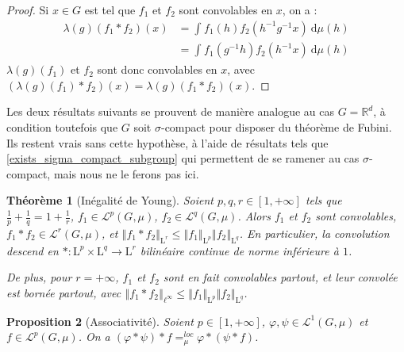 \documentclass[a4paper,12pt]{article}
\newtheorem{theorem}{Théorème}[section]
\newtheorem{proposition}[theorem]{Proposition}
\newcommand{\R}{\mathbb{R}}
\newcommand{\norm}[1]{\left\Vert #1\right\Vert}
\newcommand{\integral}[4]{\int_{#1}^{#2} #3~\mathrm{d}#4}
\newcommand{\inv}{^{-1}}
\begin{document}
\begin{proof}
    Si $x\in G$ est tel que $f_1$ et $f_2$ sont convolables en $x$, on a :
    \begin{align*}
        \lambda(g)(f_1\ast f_2)(x) 
            &= \integral{}{}{f_1(h)f_2(h\inv g\inv x)}{\mu(h)} \\
            &= \integral{}{}{f_1(g\inv h)f_2(h\inv x)}{\mu(h)} 
    \end{align*}
    $\lambda(g)(f_1)$ et $f_2$ sont donc convolables en $x$, avec $(\lambda(g)(f_1)\ast f_2)(x) = \lambda(g)(f_1\ast f_2)(x)$.
\end{proof}

Les deux résultats suivants se prouvent de manière analogue au cas $G = \R^d$, à condition toutefois que 
$G$ soit $\sigma$-compact pour disposer du théorème de Fubini. Ils restent vrais sans cette hypothèse,
à l'aide de résultats tels que \ref{exists_sigma_compact_subgroup} qui permettent de se ramener au cas $\sigma$-compact,
mais nous ne le ferons pas ici. 

\begin{theorem}[Inégalité de Young]\label{young}
    Soient $p, q, r\in[1, +\infty]$ tels que $\frac1p + \frac1q = 1 + \frac1r$, $f_1\in\mathscr{L}^p(G, \mu)$,
    $f_2\in\mathscr{L}^q(G, \mu)$. Alors $f_1$ et $f_2$ sont convolables, $f_1\ast f_2\in\mathscr{L}^r(G, \mu)$,
    et $\norm{f_1\ast f_2}_{\mathrm{L}^r} \leq \norm{f_1}_{\mathrm{L}^p} \norm{f_2}_{\mathrm{L}^q}$. En particulier, 
    la convolution descend en $\ast : \mathrm{L}^p \times \mathrm{L}^q \to \mathrm{L}^r$ bilinéaire continue de norme inférieure à $1$.

    De plus, pour $r = +\infty$, $f_1$ et $f_2$ sont en fait convolables \emph{partout}, et leur convolée 
    est bornée \emph{partout}, avec $\norm{f_1\ast f_2}_{\ell^\infty} \leq \norm{f_1}_{\mathrm{L}^p} \norm{f_2}_{\mathrm{L}^q}$.
\end{theorem}

\begin{proposition}[Associativité]\label{conv_assoc}
    Soient $p\in[1, +\infty]$, $\varphi, \psi \in\mathscr{L}^1(G, \mu)$ et $f\in\mathscr{L}^p(G, \mu)$.
    On a $(\varphi \ast \psi) \ast f =_{\mu}^{loc} \varphi \ast (\psi \ast f)$.
\end{proposition}
\end{document}
